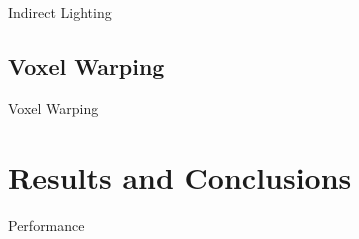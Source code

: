 \documentclass[10pt]{beamer}
\begin{document}

\begin{frame}{Indirect Lighting}
\end{frame}

\subsection{Voxel Warping}
\begin{frame}{Voxel Warping}
\end{frame}


\section{Results and Conclusions}


\begin{frame}{Performance}
\end{frame}
\end{document}
